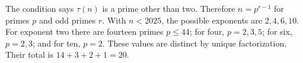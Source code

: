 The condition says $\tau(n)$ is a prime other than two. Therefore $n=p^{r-1}$ for primes $p$ and odd primes $r$. With $n<2025$, the possible exponents are $2,4,6,10$. For exponent two there are fourteen primes $p\le44$; for four, $p=2,3,5$; for six, $p=2,3$; and for ten, $p=2$. These values are distinct by unique factorization. Their total is $14+3+2+1=\boxed{20}$.
